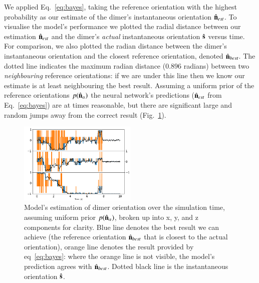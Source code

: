 \documentclass[final,  3p]{elsarticle}
\begin{document}
We applied Eq.~\eqref{eq:bayes}, taking the reference orientation with the highest probability  as our estimate of the dimer's instantaneous orientation $\hat{\bf n}_{est}$. To visualise the model's performance  we plotted the radial distance between our estimation $\hat{\bf n}_{est}$ and the dimer's \emph{actual} instantaneous orientation $\hat{\bf s}$ versus time. For comparison, we also plotted the radian distance between the  dimer's instantaneous orientation and the closest reference orientation, denoted $\hat{\bf n}_{best}$. The dotted line indicates the maximum radian distance ($0.896$ radians) between two \textit{neighbouring} reference orientations: if we are under this line then we know our estimate is at least neighbouring the best result. Assuming a uniform prior of the reference orientations $p(\hat{\bf n}_\alpha)$  the neural network's predictions ($\hat{\bf n}_{est}$ from Eq.~\eqref{eq:bayes}) are at times reasonable, but there are significant large and random jumps away from the correct result (Fig.~\ref{fig:uniform}). 

\begin{figure}[h]
	\centering
	\includegraphics[width=0.5\textwidth]{./Images/fig5.png}
	\caption{Model's estimation of dimer orientation over the simulation time, assuming uniform prior $p(\hat{\bf n}_\alpha)$, broken up into x, y, and z components for clarity. Blue line denotes the best result we can achieve (the reference orientation $\hat{\bf n}_{best}$ that is closest to the actual orientation), orange line denotes the result provided by eq~\ref{eq:bayes}: where the orange line is not visible, the model's prediction agrees with $\hat{\bf n}_{best}$. Dotted black line is the instantaneous orientation $\hat{\bf s}$.}
	\label{fig:uniform}
\end{figure} 
\end{document}

